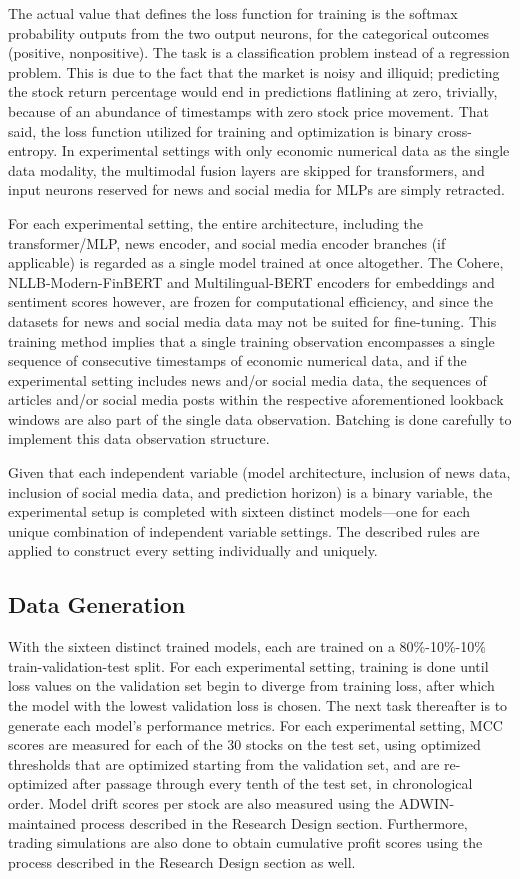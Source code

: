 \documentclass[stu,floatsintext]{apa7}
\begin{document}
The actual value that defines the loss function for training is the softmax probability outputs from the two output neurons, for the categorical outcomes (positive, nonpositive). The task is a classification problem instead of a regression problem. This is due to the fact that the market is noisy and illiquid; predicting the stock return percentage would end in predictions flatlining at zero, trivially, because of an abundance of timestamps with zero stock price movement. That said, the loss function utilized for training and optimization is binary cross-entropy. In experimental settings with only economic numerical data as the single data modality, the multimodal fusion layers are skipped for transformers, and input neurons reserved for news and social media for MLPs are simply retracted.

For each experimental setting, the entire architecture, including the transformer/MLP, news encoder, and social media encoder branches (if applicable) is regarded as a single model trained at once altogether. The Cohere, NLLB-Modern-FinBERT and Multilingual-BERT encoders for embeddings and sentiment scores however, are frozen for computational efficiency, and since the datasets for news and social media data may not be suited for fine-tuning. This training method implies that a single training observation encompasses a single sequence of consecutive timestamps of economic numerical data, and if the experimental setting includes news and/or social media data, the sequences of articles and/or social media posts within the respective aforementioned lookback windows are also part of the single data observation. Batching is done carefully to implement this data observation structure.

Given that each independent variable (model architecture, inclusion of news data, inclusion of social media data, and prediction horizon) is a binary variable, the experimental setup is completed with sixteen distinct models—one for each unique combination of independent variable settings. The described rules are applied to construct every setting individually and uniquely.

\subsection{Data Generation}

With the sixteen distinct trained models, each are trained on a 80\%-10\%-10\% train-validation-test split. For each experimental setting, training is done until loss values on the validation set begin to diverge from training loss, after which the model with the lowest validation loss is chosen. The next task thereafter is to generate each model’s performance metrics. For each experimental setting, MCC scores are measured for each of the 30 stocks on the test set, using optimized thresholds that are optimized starting from the validation set, and are re-optimized after passage through every tenth of the test set, in chronological order. Model drift scores per stock are also measured using the ADWIN-maintained process described in the Research Design section. Furthermore, trading simulations are also done to obtain cumulative profit scores using the process described in the Research Design section as well.
\end{document}
